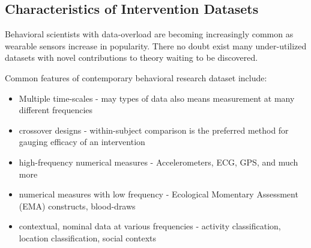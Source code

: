 \subsection{Characteristics of Intervention Datasets}

Behavioral scientists with data-overload are becoming increasingly common as wearable sensors increase in popularity.
There no doubt exist many under-utilized datasets with novel contributions to theory waiting to be discovered.

Common features of contemporary behavioral research dataset include:

\begin{itemize}
	\item{Multiple time-scales - may types of data also means measurement at many different frequencies}
	\item{crossover designs - within-subject comparison is the preferred method for gauging efficacy of an intervention}
	\item{high-frequency numerical measures - Accelerometers, ECG, GPS, and much more}
	\item{numerical measures with low frequency - Ecological Momentary Assessment (EMA) constructs, blood-draws}
	\item{contextual, nominal data at various frequencies - activity classification, location classification, social contexts}
\end{itemize}


